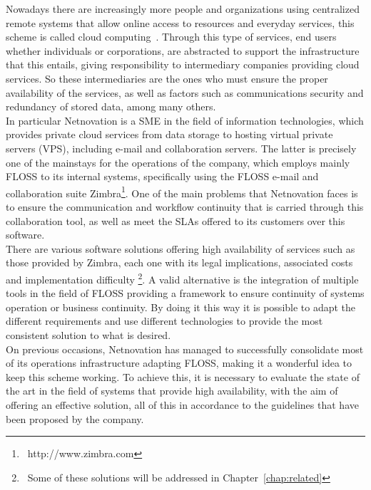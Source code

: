 \documentclass[a4paper, 12pt]{book}
\begin{document}
\noindent Nowadays there are increasingly more people and organizations using centralized remote systems that allow online access to resources and everyday services, this scheme is called cloud computing~\cite{Mell and Grance}. Through this type of services, end users whether individuals or corporations, are abstracted to support the infrastructure that this entails, giving responsibility to intermediary companies providing cloud services. So these intermediaries are the ones who must ensure the proper availability of the services, as well as factors such as communications security and redundancy of stored data, among many others.\\

\noindent In particular Netnovation is a SME in the field of information technologies, which provides private cloud services from data storage to hosting virtual private servers (VPS), including e-mail and collaboration servers. The latter is precisely one of the mainstays for the operations of the company, which employs mainly FLOSS to its internal systems, specifically using the FLOSS e-mail and collaboration suite Zimbra\texttrademark \footnote{\ http://www.zimbra.com}. One of the main problems that Netnovation faces is to ensure the communication and workflow continuity that is carried through this collaboration tool, as well as meet the SLAs offered to its customers over this software.\\

\noindent There are various software solutions offering high availability of services such as those provided by Zimbra, each one with its legal implications, associated costs and implementation difficulty \footnote{\ Some of these solutions will be addressed in Chapter~\ref{chap:related}}. A valid alternative is the integration of multiple tools in the field of FLOSS providing a framework to ensure  continuity of systems operation or business continuity. By doing it this way it is possible to adapt the different requirements and use different technologies to provide the most consistent solution to what is desired.\\

\noindent On previous occasions, Netnovation has managed to successfully consolidate most of its operations infrastructure adapting FLOSS, making it a wonderful idea to keep this scheme working. To achieve this, it is necessary to evaluate the state of the art in the field of systems that provide high availability, with the aim of offering an effective solution, all of this in accordance to the guidelines that have been proposed by the company.
\end{document}
